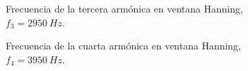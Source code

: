 \begin{figure}[H]
\begin{subfigure}[H]{0.48\textwidth}
        \end{subfigure}
        \begin{subfigure}[H]{0.48\textwidth}
          \caption{Frecuencia de la tercera armónica en ventana Hanning, $f_{3}=2950~Hz$.}
        \end{subfigure}
        \begin{subfigure}[H]{0.48\textwidth}
          \caption{Frecuencia de la cuarta armónica en ventana Hanning, $f_{4}=3950~Hz$.}
        \end{subfigure}
        \begin{subfigure}[H]{0.48\textwidth}

\end{subfigure}
\end{figure}
